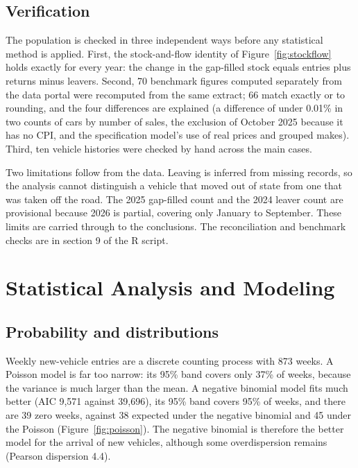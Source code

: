 \documentclass{xmum_asg}
\begin{document}
\subsection{Verification}

The population is checked in three independent ways before any statistical method is applied. First, the stock-and-flow identity of Figure~\ref{fig:stockflow} holds exactly for every year: the change in the gap-filled stock equals entries plus returns minus leavers. Second, 70 benchmark figures computed separately from the data portal were recomputed from the same extract; 66 match exactly or to rounding, and the four differences are explained (a difference of under 0.01\% in two counts of cars by number of sales, the exclusion of October 2025 because it has no CPI, and the specification model's use of real prices and grouped makes). Third, ten vehicle histories were checked by hand across the main cases.

Two limitations follow from the data. Leaving is inferred from missing records, so the analysis cannot distinguish a vehicle that moved out of state from one that was taken off the road. The 2025 gap-filled count and the 2024 leaver count are provisional because 2026 is partial, covering only January to September. These limits are carried through to the conclusions. The reconciliation and benchmark checks are in section 9 of the R script.

\FloatBarrier

\section{Statistical Analysis and Modeling}

\subsection{Probability and distributions}

Weekly new-vehicle entries are a discrete counting process with 873 weeks. A Poisson model is far too narrow: its 95\% band covers only 37\% of weeks, because the variance is much larger than the mean. A negative binomial model fits much better (AIC 9,571 against 39,696), its 95\% band covers 95\% of weeks, and there are 39 zero weeks, against 38 expected under the negative binomial and 45 under the Poisson (Figure~\ref{fig:poisson}). The negative binomial is therefore the better model for the arrival of new vehicles, although some overdispersion remains (Pearson dispersion 4.4).
\end{document}
